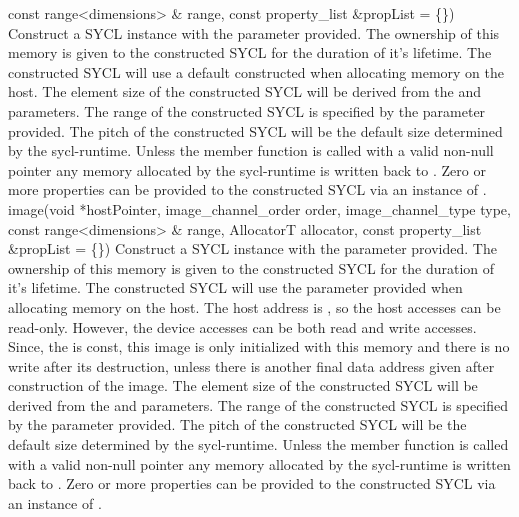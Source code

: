       { const range<dimensions> \& range, }
      { const property_list \&propList = \{\}) }
      {
         Construct a SYCL  instance with the  parameter provided. The ownership of this memory is given to the constructed SYCL  for the duration of it's lifetime.
         The constructed SYCL  will use a default constructed  when allocating memory on the host.
         The element size of the constructed SYCL  will be derived from the  and  parameters.
         The range of the constructed SYCL  is specified by the  parameter provided.
         The pitch of the constructed SYCL  will be the default size determined by the \gls{sycl-runtime}.
         Unless the member function  is called with a valid non-null pointer any memory allocated by the \gls{sycl-runtime} is written back to .
         Zero or more properties can be provided to the constructed SYCL  via an instance of .
    }
    \addRowSixSL
      {image(void *hostPointer, }
      { image_channel_order order, }
      { image_channel_type type, }
      { const range<dimensions> \& range, }
      { AllocatorT allocator, }
      { const property_list \&propList = \{\}) }
      {
         Construct a SYCL  instance with the  parameter provided. The ownership of this memory is given to the constructed SYCL  for the duration of it's lifetime.       
         The constructed SYCL  will use the  parameter provided when allocating memory on the host.
         The host address is , so the host accesses can be read-only. However, the device accesses can be both read and write accesses. Since, the  is const, this image is only initialized with this memory and there is no write after its destruction, unless there is another final data address given after construction of the image.
         The element size of the constructed SYCL  will be derived from the  and  parameters.
         The range of the constructed SYCL  is specified by the  parameter provided.
         The pitch of the constructed SYCL  will be the default size determined by the \gls{sycl-runtime}.
         Unless the member function  is called with a valid non-null pointer any memory allocated by the \gls{sycl-runtime} is written back to .
         Zero or more properties can be provided to the constructed SYCL  via an instance of .
      }
